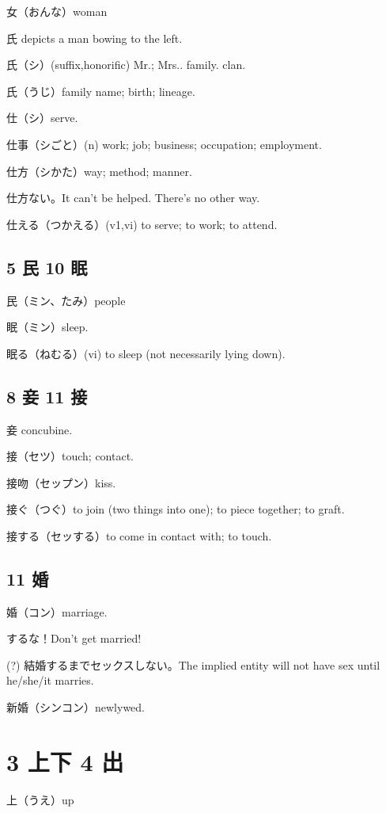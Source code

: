 女（おんな）woman

氏 depicts a man bowing to the left.

氏（シ）(suffix,honorific) Mr.; Mrs.. family. clan.

氏（うじ）family name; birth; lineage.

仕（シ）serve.

仕事（シごと）(n) work; job; business; occupation; employment.

仕方（シかた）way; method; manner.

仕方ない。It can't be helped. There's no other way.

仕える（つかえる）(v1,vi) to serve; to work; to attend.

\subsection{5 民 10 眠}

民（ミン、たみ）people

眠（ミン）sleep.

眠る（ねむる）(vi) to sleep (not necessarily lying down).

\subsection{8 妾 11 接}

妾 concubine.

接（セツ）touch; contact.

接吻（セップン）kiss.

接ぐ（つぐ）to join (two things into one); to piece together; to graft.

接する（セッする）to come in contact with; to touch.

\subsection{11 婚}

婚（コン）marriage.

するな！Don't get married!

(?) 結婚するまでセックスしない。The implied entity will not have sex until he/she/it marries.

新婚（シンコン）newlywed.

\section{3 上下 4 出}

上（うえ）up

